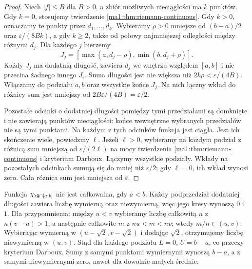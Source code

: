 \begin{proof}
Niech $|f|\le B$ dla $B>0$, a zbiór możliwych nieciągłości ma $k$ punktów. Gdy $k=0$, stosujemy twierdzenie \ref{ma1:thm:riemann-continuous}. Gdy $k>0$, oznaczamy te punkty przez $d_1,\ldots,d_k$. Wybieramy $\rho>0$ mniejsze od $(b-a)/2$ oraz $\varepsilon/(8Bk)$, a gdy $k\ge2$, także od połowy najmniejszej odległości między różnymi $d_j$. Dla każdego $j$ bierzemy
\[
 J_j=[\max(a,d_j-\rho),\min(b,d_j+\rho)].
\]
Każdy $J_j$ ma dodatnią długość, zawiera $d_j$ we wnętrzu względem $[a,b]$ i nie przecina żadnego innego $J_i$. Suma długości jest nie większa niż $2k\rho<\varepsilon/(4B)$. Włączamy do podziału $a,b$ oraz wszystkie końce $J_j$. Na nich łączny wkład do różnicy sum jest mniejszy od $2B\varepsilon/(4B)=\varepsilon/2$.

Pozostałe odcinki o dodatniej długości pomiędzy tymi przedziałami są domknięte i nie zawierają punktów nieciągłości: końce wewnętrzne wybranych przedziałów nie są tymi punktami. Na każdym z tych odcinków funkcja jest ciągła. Jest ich skończenie wiele, powiedzmy $\ell$. Jeżeli $\ell>0$, wybieramy na każdym podział z różnicą sum mniejszą od $\varepsilon/(2\ell)$ na mocy twierdzenia \ref{ma1:thm:riemann-continuous} i kryterium Darboux. Łączymy wszystkie podziały. Wkłady na pozostałych odcinkach sumują się do mniej niż $\varepsilon/2$; gdy $\ell=0$, ich wkład wynosi zero. Cała różnica sum jest mniejsza od $\varepsilon$.
\end{proof}
\begin{przyklad}
\label{ma1:ex:riemann-dirichlet}
Funkcja $\chi_{\Q\cap[a,b]}$ nie jest całkowalna, gdy $a<b$. Każdy podprzedział dodatniej długości zawiera liczbę wymierną oraz niewymierną, więc jego kresy wynoszą $0$ i $1$. Dla przypomnienia: między $u<v$ wybieramy liczbę całkowitą $n$ z $n(v-u)>1$, a następnie całkowite $m$ z $nu<m<nv$; wtedy $m/n\in(u,v)$. Wybierając wymierną w $(u-\sqrt2,v-\sqrt2)$ i dodając $\sqrt2$, otrzymujemy liczbę niewymierną w $(u,v)$. Stąd dla każdego podziału $L=0$, $U=b-a$, co przeczy kryterium Darboux. Sumy z samymi punktami wymiernymi wynoszą $b-a$, a z samymi niewymiernymi zero, nawet dla dowolnie małych średnic.
\end{przyklad}

